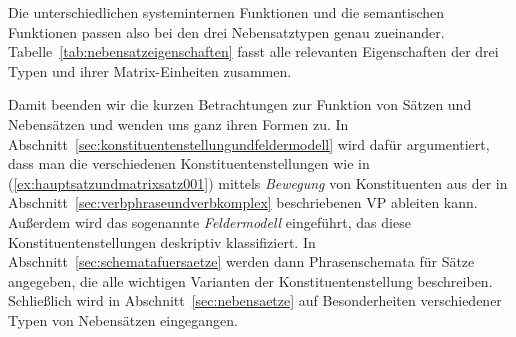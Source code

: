 Die unterschiedlichen systeminternen Funktionen und die semantischen Funktionen passen also bei den drei Nebensatztypen genau zueinander.
Tabelle~\ref{tab:nebensatzeigenschaften} fasst alle relevanten Eigenschaften der drei Typen und ihrer Matrix-Einheiten zusammen.

\begin{table}
  \centering
  \caption{Eigenschaften der drei Typen von Nebensätzen und ihrer jeweiligen Matrix; zur syntaktischen Kategorie RS siehe Abschnitt~\ref{sec:relativsaetze}}
  \label{tab:nebensatzeigenschaften}
\end{table}

Damit beenden wir die kurzen Betrachtungen zur Funktion von Sätzen und Nebensätzen und wenden uns ganz ihren Formen zu.
In Abschnitt~\ref{sec:konstituentenstellungundfeldermodell} wird dafür argumentiert, dass man die verschiedenen Konstituentenstellungen wie in (\ref{ex:hauptsatzundmatrixsatz001}) mittels \textit{Bewegung} von Konstituenten aus der in Abschnitt~\ref{sec:verbphraseundverbkomplex} beschriebenen VP ableiten kann.
Außerdem wird das sogenannte \textit{Feldermodell} eingeführt, das diese Konstituentenstellungen deskriptiv klassifiziert.
In Abschnitt~\ref{sec:schematafuersaetze} werden dann Phrasenschemata für Sätze angegeben, die alle wichtigen Varianten der Konstituentenstellung beschreiben.
Schließlich wird in Abschnitt~\ref{sec:nebensaetze} auf Besonderheiten verschiedener Typen von Nebensätzen eingegangen.

